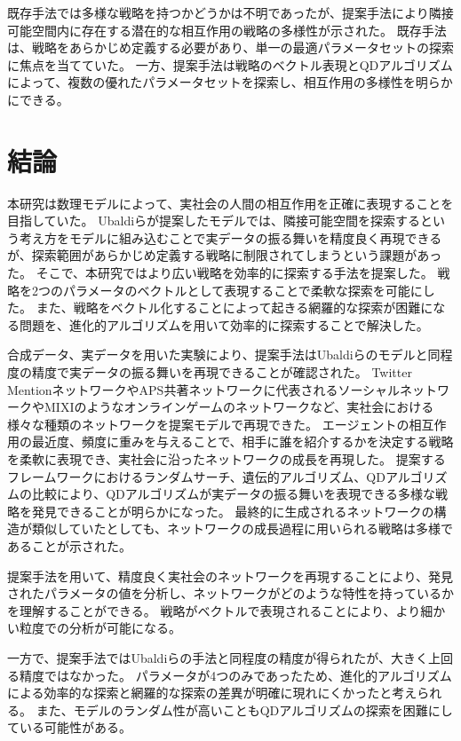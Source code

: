\documentclass[uplatex,11pt,openany]{ujreport}
\begin{document}
            既存手法では多様な戦略を持つかどうかは不明であったが、提案手法により隣接可能空間内に存在する潜在的な相互作用の戦略の多様性が示された。
            既存手法は、戦略をあらかじめ定義する必要があり、単一の最適パラメータセットの探索に焦点を当てていた。
            一方、提案手法は戦略のベクトル表現とQDアルゴリズムによって、複数の優れたパラメータセットを探索し、相互作用の多様性を明らかにできる。


\chapter{結論}
    本研究は数理モデルによって、実社会の人間の相互作用を正確に表現することを目指していた。
    Ubaldiらが提案したモデルでは、隣接可能空間を探索するという考え方をモデルに組み込むことで実データの振る舞いを精度良く再現できるが、探索範囲があらかじめ定義する戦略に制限されてしまうという課題があった。
    そこで、本研究ではより広い戦略を効率的に探索する手法を提案した。
    戦略を2つのパラメータのベクトルとして表現することで柔軟な探索を可能にした。
    また、戦略をベクトル化することによって起きる網羅的な探索が困難になる問題を、進化的アルゴリズムを用いて効率的に探索することで解決した。

    合成データ、実データを用いた実験により、提案手法はUbaldiらのモデルと同程度の精度で実データの振る舞いを再現できることが確認された。
    Twitter MentionネットワークやAPS共著ネットワークに代表されるソーシャルネットワークやMIXIのようなオンラインゲームのネットワークなど、実社会における様々な種類のネットワークを提案モデルで再現できた。
    エージェントの相互作用の最近度、頻度に重みを与えることで、相手に誰を紹介するかを決定する戦略を柔軟に表現でき、実社会に沿ったネットワークの成長を再現した。
    提案するフレームワークにおけるランダムサーチ、遺伝的アルゴリズム、QDアルゴリズムの比較により、QDアルゴリズムが実データの振る舞いを表現できる多様な戦略を発見できることが明らかになった。
    最終的に生成されるネットワークの構造が類似していたとしても、ネットワークの成長過程に用いられる戦略は多様であることが示された。

    提案手法を用いて、精度良く実社会のネットワークを再現することにより、発見されたパラメータの値を分析し、ネットワークがどのような特性を持っているかを理解することができる。
    戦略がベクトルで表現されることにより、より細かい粒度での分析が可能になる。

    一方で、提案手法ではUbaldiらの手法と同程度の精度が得られたが、大きく上回る精度ではなかった。
    パラメータが4つのみであったため、進化的アルゴリズムによる効率的な探索と網羅的な探索の差異が明確に現れにくかったと考えられる。
    また、モデルのランダム性が高いこともQDアルゴリズムの探索を困難にしている可能性がある。
\end{document}
